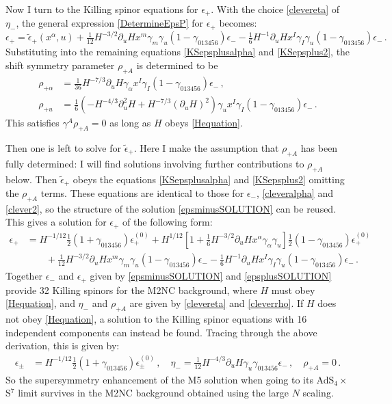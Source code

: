 \documentclass[11pt]{article}
\newcommand{\be}{\begin{equation}}
\newcommand{\ee}{\end{equation}}
\newcommand{\epsc}{\epsilon^{(0)}}
\numberwithin{equation}{section}
\begin{document}
{{Now I turn to the Killing spinor equations for $\epsilon_+$. 
With the choice \eqref{clevereta} of $\eta_-$, the general expression \eqref{DetermineEpsP} for $\epsilon_+$ becomes:
\be
\epsilon_+ = \tilde \epsilon_+ (x^\alpha, u) 
+ \tfrac{1}{12}  H^{-3/2} \partial_u H x^m  \gamma_m\gamma_u ( 1 - \gamma_{013456} ) \epsilon_- 
-\tfrac16 H^{-1} \partial_u H x^I \gamma_I \gamma_u (1- \gamma_{013456} ) \epsilon_- \,.
\ee
Substituting into the remaining equations \eqref{KSepsplusalpha} and \eqref{KSepsplus2}, the shift symmetry parameter $\rho_{+A}$ is determined to be 
\be
\begin{split}
\rho_{+ \alpha}& = \tfrac{1}{36} H^{-7/3} \partial_u H \gamma_\alpha x^I \gamma_I ( 1  - \gamma_{013456} ) \epsilon_-  %
\,,\\[4pt]
\rho_{+u} &= \tfrac{1}{6} (- H^{-4/3} \partial_u^2 H +H^{-7/3} (\partial_u H)^2 ) \gamma_u x^I \gamma_I ( 1  - \gamma_{013456} ) \epsilon_-
 \,.
\end{split}
\label{cleverrho}
\ee
This satisfies $\gamma^A \rho_{+A} = 0$ as long as $H$ obeys \eqref{Hequation}.

Then one is left to solve for $\tilde \epsilon_+$. %
Here I make the assumption that $\rho_{+A}$ has been fully determined: I will find solutions involving further contributions to $\rho_{+A}$ below.
Then $\tilde \epsilon_+$ obeys the  equations \eqref{KSepsplusalpha} and \eqref{KSepsplus2} omitting the $\rho_{+A}$ terms.
These equations are identical to those for $\epsilon_-$, \eqref{cleveralpha} and \eqref{clever2}, so the structure of the solution \eqref{epsminusSOLUTION} can be reused.
This gives a solution for $\epsilon_+$ of the following form:
\be
\begin{split} 
\epsilon_+ & = 
 H^{-1/12} \tfrac12 ( 1 +  \gamma_{013456} ) \epsc_+
+ H^{1/12} \left[
1 + \tfrac{1}{6} H^{-3/2}  \partial_u H  x^\alpha \gamma_\alpha \gamma_u 
\right]\tfrac12 ( 1 - \gamma_{013456} )\epsc_+ 
\\[4pt] & \qquad
+ \tfrac{1}{12}  H^{-3/2} \partial_u H x^m  \gamma_m\gamma_u ( 1 - \gamma_{013456} ) \epsilon_- 
-\tfrac16 H^{-1} \partial_u H x^I \gamma_I \gamma_u (1- \gamma_{013456} ) \epsilon_- \,.
\end{split}
\label{epsplusSOLUTION}
\ee
Together $\epsilon_-$ and $\epsilon_+$ given by \eqref{epsminusSOLUTION} and \eqref{epsplusSOLUTION} provide 32 Killing spinors for the M2NC background, where $H$ must obey \eqref{Hequation}, and $\eta_-$ and $\rho_{+A}$ are given by \eqref{clevereta} and \eqref{cleverrho}.
If $H$ does not obey \eqref{Hequation}, a solution to the Killing spinor equations with 16 independent components can instead be found.
Tracing through the above derivation, this is given by:
\be
\begin{split}
\epsilon_\pm & =  H^{-1/12} \tfrac12 ( 1 +  \gamma_{013456} ) \epsc_\pm\,,\quad
\eta_- = \tfrac{1}{12} H^{-4/3} \partial_u H \gamma_u \gamma_{013456} \epsilon_- \,,\quad
\rho_{+A} = 0 \,.
\end{split}
\ee
So the supersymmetry enhancement of the M5 solution when going to its AdS${}_4\times$ S${}^7$ limit survives in the M2NC background obtained using the large $N$ scaling.


}}
\end{document}
